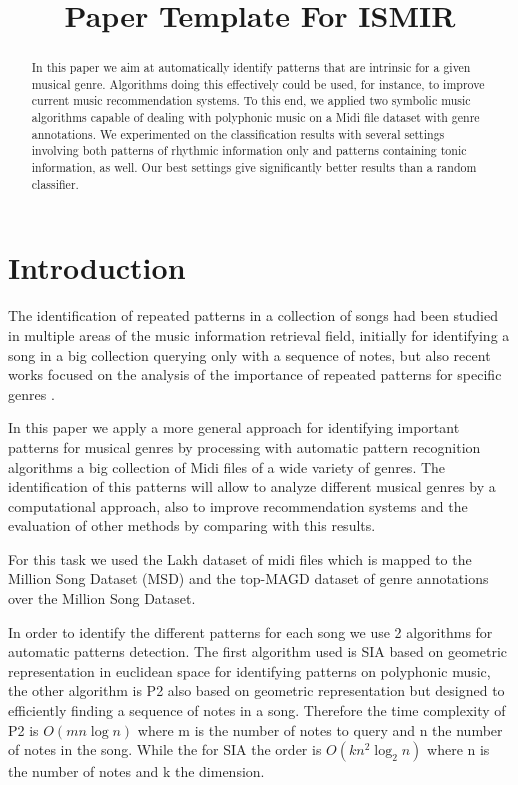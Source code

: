 \documentclass{article}
\title{Paper Template For ISMIR \conferenceyear}
\begin{document}
%
\maketitle
%
\begin{abstract}
In this paper we aim at automatically identify patterns that are intrinsic for a given musical genre. Algorithms doing this effectively could be used, for instance, to improve current music recommendation systems. To this end, we applied two symbolic music algorithms capable of dealing with polyphonic music on a Midi file dataset with genre annotations. We experimented on the classification results with several settings involving both patterns of rhythmic information only and patterns containing tonic information, as well. Our best settings give significantly better results than a random classifier. 
\end{abstract}
%
\section{Introduction}\label{sec:introduction}

The identification of repeated patterns in a collection of songs had been studied in multiple areas of the music information retrieval field, initially for identifying a song in a big collection querying only with a sequence of notes, but also recent works focused on the analysis of the importance of repeated patterns for specific genres \cite{boot,koops,odekerken,forth}.

In this paper we apply a more general approach for identifying important patterns for musical genres by processing with automatic pattern recognition algorithms a big collection of Midi files of a wide variety of genres. The identification of this patterns will allow to analyze different musical genres by a computational approach, also to improve recommendation systems and the evaluation of other methods by comparing with this results.

For this task we used the Lakh dataset \cite{raffel} of midi files which is mapped to the Million Song Dataset (MSD) \cite{Bertin-Mahieux2011} and the top-MAGD dataset \cite{Schindler:3} of genre annotations over the Million Song Dataset.

In order to identify the different patterns for each song we use 2 algorithms for automatic patterns detection. The first algorithm used is SIA \cite{doi:10.1076/jnmr.31.4.321.14162} based on geometric representation in euclidean space for identifying patterns on polyphonic music, the other algorithm is P2 \cite{Ukkonen:2} also based on geometric representation but designed to efficiently finding a sequence of notes in a song. Therefore the time complexity of P2 is $O(mn\log n)$ where m is the number of notes to query and n the number of notes in the song. While the for SIA the order is $O(kn^2\log_2 n)$ where n is the number of notes and k the dimension.
\end{document}
